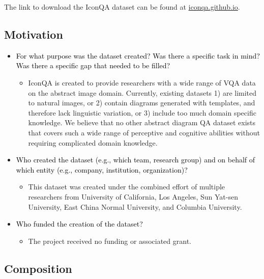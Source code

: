 \documentclass{article}
\newcommand{\ques}[1]{\textcolor{black}{#1}}
\begin{document}
The link to download the IconQA dataset can be found at \url{iconqa.github.io}.

\subsection{Motivation}

\begin{itemize}
    \item \ques{For what purpose was the dataset created? Was there a specific task in mind? Was there a specific gap that needed to be filled?}
    \begin{itemize}
        \item IconQA is created to provide researchers with a wide range of VQA data on the abstract image domain. Currently, existing datasets 1) are limited to natural images, or 2) contain diagrams generated with templates, and therefore lack linguistic variation, or 3) include too much domain specific knowledge. We believe that no other abstract diagram QA dataset exists that covers such a wide range of perceptive and cognitive abilities without requiring complicated domain knowledge.
    \end{itemize}
    \item \ques{Who created the dataset (e.g., which team, research group) and on
behalf of which entity (e.g., company, institution, organization)?}
    \begin{itemize}
        \item This dataset was created under the combined effort of multiple researchers from University of California, Los Angeles, Sun Yat-sen University, East China Normal University, and Columbia University.
    \end{itemize}
    \item \ques{Who funded the creation of the dataset?}
    \begin{itemize}
        \item The project received no funding or associated grant.
    \end{itemize}
\end{itemize}

\subsection{Composition}
\end{document}
